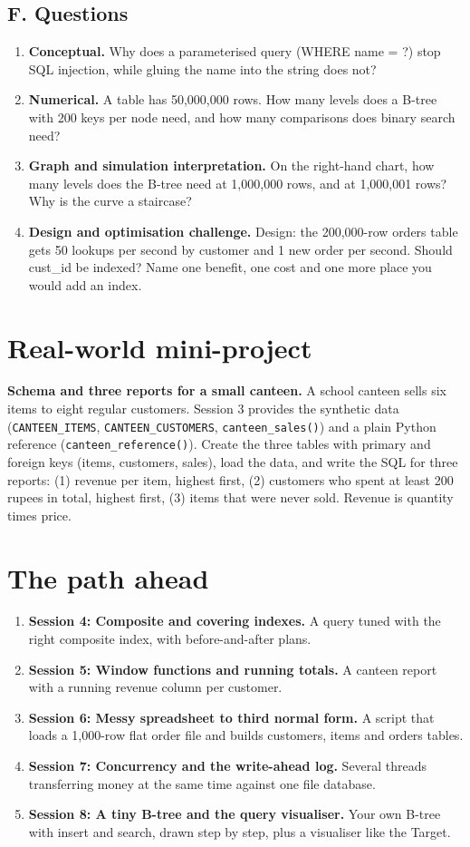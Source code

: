 \documentclass[11pt,a4paper]{article}
\begin{document}
\subsection*{F. Questions}
\begin{enumerate}[nosep]
\item \textbf{Conceptual.} Why does a parameterised query (WHERE name = ?) stop SQL injection, while gluing the name into the string does not?
\item \textbf{Numerical.} A table has 50,000,000 rows. How many levels does a B-tree with 200 keys per node need, and how many comparisons does binary search need?
\item \textbf{Graph and simulation interpretation.} On the right-hand chart, how many levels does the B-tree need at 1,000,000 rows, and at 1,000,001 rows? Why is the curve a staircase?
\item \textbf{Design and optimisation challenge.} Design: the 200,000-row orders table gets 50 lookups per second by customer and 1 new order per second. Should cust\_id be indexed? Name one benefit, one cost and one more place you would add an index.
\end{enumerate}

\section{Real-world mini-project}
\textbf{Schema and three reports for a small canteen.} A school canteen sells six items to eight regular customers. Session 3 provides the synthetic data (\texttt{CANTEEN\_ITEMS}, \texttt{CANTEEN\_CUSTOMERS}, \texttt{canteen\_sales()}) and a plain Python reference (\texttt{canteen\_reference()}). Create the three tables with primary and foreign keys (items, customers, sales), load the data, and write the SQL for three reports: (1) revenue per item, highest first, (2) customers who spent at least 200 rupees in total, highest first, (3) items that were never sold. Revenue is quantity times price.

\section{The path ahead}
\begin{enumerate}[nosep]
\item \textbf{Session 4: Composite and covering indexes.} A query tuned with the right composite index, with before-and-after plans.
\item \textbf{Session 5: Window functions and running totals.} A canteen report with a running revenue column per customer.
\item \textbf{Session 6: Messy spreadsheet to third normal form.} A script that loads a 1,000-row flat order file and builds customers, items and orders tables.
\item \textbf{Session 7: Concurrency and the write-ahead log.} Several threads transferring money at the same time against one file database.
\item \textbf{Session 8: A tiny B-tree and the query visualiser.} Your own B-tree with insert and search, drawn step by step, plus a visualiser like the Target.
\end{enumerate}
\end{document}
